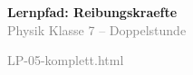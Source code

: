 \documentclass[a4paper]{article}
\begin{document}
\begin{center}
\textcolor{physik}{\Large\bfseries Lernpfad: Reibungskraefte}\\[0.5em]
\textcolor{gray}{\small Physik Klasse 7 -- Doppelstunde}\\[2em]


\vspace{1em}
\textcolor{gray}{\footnotesize LP-05-komplett.html}
\end{center}
\end{document}
